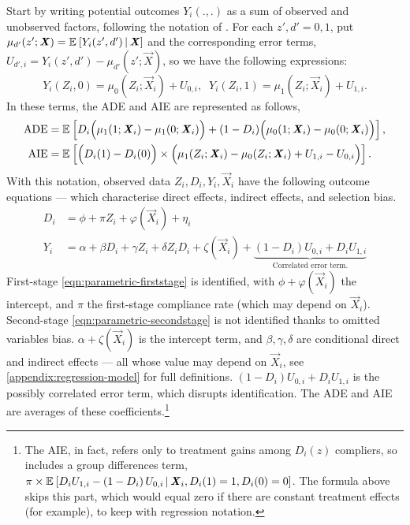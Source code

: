 Start by writing potential outcomes $Y_i(., .)$ as a sum of observed and unobserved factors, following the notation of \cite{heckman2005structural}.
For each $z',d' = 0,1$, put $\mu_{d'}(z'; \boldsymbol{\mathit{X}}) = \mathbb{E}_{} \left[ Y_i(z', d') \, \middle\vert \, \boldsymbol{\mathit{X}} \right]$ and the corresponding error terms, $U_{d', i} = Y_i(z', d') - \mu_{d'}(z'; \vec X)$, so we have the following expressions:
\[ Y_i(Z_i, 0)
        = \mu_{0}(Z_i; \vec X_i) + U_{0,i}, \;\;
    Y_i(Z_i, 1)
        = \mu_{1}(Z_i; \vec X_i) + U_{1,i}. \]
In these terms, the ADE and AIE are represented as follows,
\begin{align*}
    \text{ADE}
    &= \mathbb{E}_{} \left[  D_i \Big( \mu_{1}(1; \boldsymbol{\mathit{X}}_i) - \mu_{1}(0; \boldsymbol{\mathit{X}}_i)\Big)
        + (1 - D_i) \Big( \mu_{0}(1; \boldsymbol{\mathit{X}}_i) - \mu_{0}(0; \boldsymbol{\mathit{X}}_i)\Big) \right], \\
    \text{AIE}
        &= \mathbb{E}_{} \left[ \Big( D_i(1) - D_i(0) \Big)
        \times \Big( \mu_1(Z_i; \boldsymbol{\mathit{X}}_i) - \mu_0(Z_i; \boldsymbol{\mathit{X}}_i) + U_{1,i} - U_{0,i}\Big)  \right].
\end{align*}
With this notation, observed data $Z_i, D_i, Y_i, \vec X_i$ have the following outcome equations --- which characterise direct effects, indirect effects, and selection bias.
\begin{align}
    \label{eqn:parametric-firststage}
    D_i &= \phi + \pi Z_i + \varphi(\vec X_i) + \eta_i  \\
    \label{eqn:parametric-secondstage}
    Y_i &= \alpha + \beta D_i + \gamma Z_i + \delta Z_i D_i
    + \zeta(\vec X_i)
    + \underbrace{\left(1 - D_i \right)U_{0,i} + D_i U_{1,i}}_{
        \text{Correlated error term.}}
\end{align}
First-stage \eqref{eqn:parametric-firststage} is identified, with $\phi + \varphi(\vec X_i)$ the intercept, and $\pi$ the first-stage compliance rate (which may depend on $\vec X_i$).
Second-stage \eqref{eqn:parametric-secondstage} is not identified thanks to omitted variables bias.
$\alpha + \zeta(\vec X_i)$ is the intercept term, and $\beta, \gamma, \delta$ are conditional direct and indirect effects --- all whose value may depend on $\vec X_i$, see \autoref{appendix:regression-model} for full definitions.
$\left(1 - D_i \right)U_{0,i} + D_i U_{1,i}$ is the possibly correlated error term, which disrupts identification.
The ADE and AIE are averages of these coefficients.\footnote{
    The AIE, in fact, refers only to treatment gains among $D_i(z)$ compliers, so includes a group differences term, $\pi \times\mathbb{E}_{} \left[ 
            D_i U_{1,i} - \left(1 - D_i \right)U_{0,i}
         \, \middle\vert \, \boldsymbol{\mathit{X}}_i, D_i(1) = 1, D_i(0) = 0 \right] $.
    The formula above skips this part, which would equal zero if there are constant treatment effects (for example), to keep with regression notation.
}

